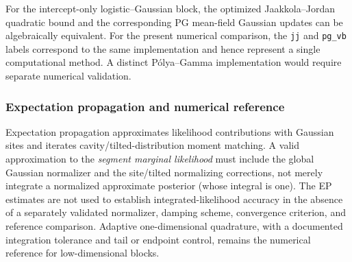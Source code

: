 For the intercept-only logistic--Gaussian block, the optimized Jaakkola--Jordan quadratic bound and the corresponding PG mean-field Gaussian updates can be algebraically equivalent. For the present numerical comparison, the \texttt{jj} and \texttt{pg\_vb} labels correspond to the same implementation and hence represent a single computational method. A distinct P\'olya--Gamma implementation would require separate numerical validation.

\subsubsection{Expectation propagation and numerical reference}
Expectation propagation approximates likelihood contributions with Gaussian sites and iterates cavity/tilted-distribution moment matching. A valid approximation to the \emph{segment marginal likelihood} must include the global Gaussian normalizer and the site/tilted normalizing corrections, not merely integrate a normalized approximate posterior (whose integral is one). The EP estimates are not used to establish integrated-likelihood accuracy in the absence of a separately validated normalizer, damping scheme, convergence criterion, and reference comparison. Adaptive one-dimensional quadrature, with a documented integration tolerance and tail or endpoint control, remains the numerical reference for low-dimensional blocks.
